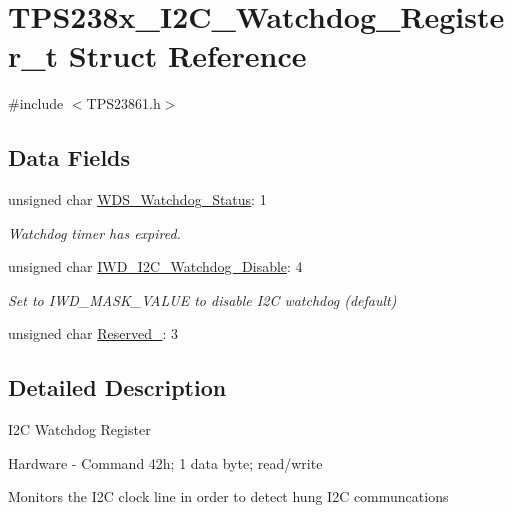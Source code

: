 \hypertarget{struct_t_p_s238x___i2_c___watchdog___register__t}{\section{T\-P\-S238x\-\_\-\-I2\-C\-\_\-\-Watchdog\-\_\-\-Register\-\_\-t Struct Reference}
\label{struct_t_p_s238x___i2_c___watchdog___register__t}
}


{\ttfamily \#include $<$T\-P\-S23861.\-h$>$}

\subsection*{Data Fields}
\begin{DoxyCompactItemize}
\item 
unsigned char \hyperlink{struct_t_p_s238x___i2_c___watchdog___register__t_aeaba671bd7a4aa4b365b8eca951032b7}{W\-D\-S\-\_\-\-Watchdog\-\_\-\-Status}\-: 1
\begin{DoxyCompactList}\small\item\em Watchdog timer has expired. \end{DoxyCompactList}\item 
unsigned char \hyperlink{struct_t_p_s238x___i2_c___watchdog___register__t_a5bf45acdc0e9207ca42d48f1b7ea3975}{I\-W\-D\-\_\-\-I2\-C\-\_\-\-Watchdog\-\_\-\-Disable}\-: 4
\begin{DoxyCompactList}\small\item\em Set to I\-W\-D\-\_\-\-M\-A\-S\-K\-\_\-\-V\-A\-L\-U\-E to disable I2\-C watchdog (default) \end{DoxyCompactList}\item 
unsigned char \hyperlink{struct_t_p_s238x___i2_c___watchdog___register__t_a8beadf90c2c5b9afee80e166696912a6}{Reserved\-\_}\-: 3
\end{DoxyCompactItemize}


\subsection{Detailed Description}
I2\-C Watchdog Register \par
 Hardware -\/ Command 42h; 1 data byte; read/write \par
\par
 Monitors the I2\-C clock line in order to detect hung I2\-C communcations 

